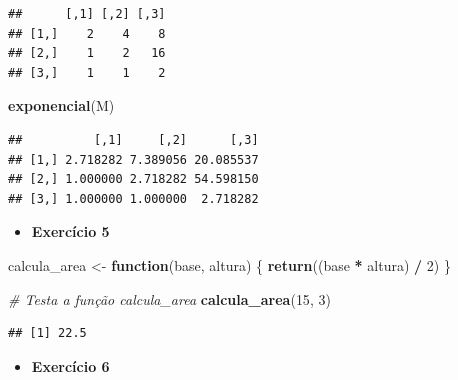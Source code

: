 \documentclass[
]{book}
\newenvironment{Shaded}{\begin{snugshade}}{\end{snugshade}}
\newcommand{\CommentTok}[1]{\textcolor[rgb]{0.56,0.35,0.01}{\textit{#1}}}
\newcommand{\ControlFlowTok}[1]{\textcolor[rgb]{0.13,0.29,0.53}{\textbf{#1}}}
\newcommand{\DecValTok}[1]{\textcolor[rgb]{0.00,0.00,0.81}{#1}}
\newcommand{\FunctionTok}[1]{\textcolor[rgb]{0.13,0.29,0.53}{\textbf{#1}}}
\newcommand{\NormalTok}[1]{#1}
\newcommand{\OtherTok}[1]{\textcolor[rgb]{0.56,0.35,0.01}{#1}}
\newcommand{\SpecialCharTok}[1]{\textcolor[rgb]{0.81,0.36,0.00}{\textbf{#1}}}
\providecommand{\tightlist}{%
  \setlength{\itemsep}{0pt}\setlength{\parskip}{0pt}}
\begin{document}
\begin{verbatim}
##      [,1] [,2] [,3]
## [1,]    2    4    8
## [2,]    1    2   16
## [3,]    1    1    2
\end{verbatim}

\begin{Shaded}
\begin{Highlighting}[]
\FunctionTok{exponencial}\NormalTok{(M)}
\end{Highlighting}
\end{Shaded}

\begin{verbatim}
##          [,1]     [,2]      [,3]
## [1,] 2.718282 7.389056 20.085537
## [2,] 1.000000 2.718282 54.598150
## [3,] 1.000000 1.000000  2.718282
\end{verbatim}

\begin{itemize}
\tightlist
\item
  \textbf{Exercício 5}
\end{itemize}

\begin{Shaded}
\begin{Highlighting}[]
\NormalTok{calcula\_area }\OtherTok{\textless{}{-}} \ControlFlowTok{function}\NormalTok{(base, altura) \{}
  \FunctionTok{return}\NormalTok{((base }\SpecialCharTok{*}\NormalTok{ altura) }\SpecialCharTok{/} \DecValTok{2}\NormalTok{)}
\NormalTok{\}}

\CommentTok{\# Testa a função \textquotesingle{}calcula\_area\textquotesingle{}}
\FunctionTok{calcula\_area}\NormalTok{(}\DecValTok{15}\NormalTok{, }\DecValTok{3}\NormalTok{)}
\end{Highlighting}
\end{Shaded}

\begin{verbatim}
## [1] 22.5
\end{verbatim}

\begin{itemize}
\tightlist
\item
  \textbf{Exercício 6}
\end{itemize}
\end{document}
